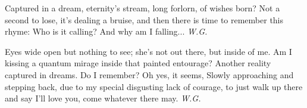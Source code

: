 Captured in a dream, 
eternity's stream, 
long forlorn, 
of wishes born? 
Not a second to lose, 
it's dealing a bruise, 
and then there is time 
to remember this rhyme: 
Who is it calling? 
And why am I falling... 
\emph{W.G.}

Eyes wide open but nothing to see; 
she's not out there, but inside of me. 
Am I kissing a quantum mirage 
inside that painted entourage? 
Another reality captured in dreams. 
Do I remember? Oh yes, it seems, 
Slowly approaching and stepping back, 
due to my special disgusting lack 
of courage, to just walk up there and say 
I'll love you, come whatever there may. 
\emph{W.G.}
